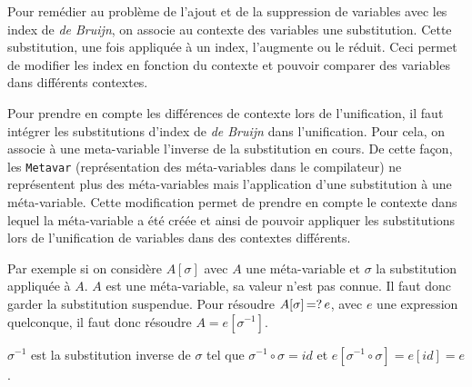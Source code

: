                 Pour remédier au problème de l'ajout et de la suppression de variables avec les index de \textit{de Bruijn}, on associe au contexte des
                variables une substitution. Cette substitution, une fois appliquée à un index, l'augmente ou le réduit.
                Ceci permet de modifier les index en fonction du contexte et pouvoir comparer des variables dans différents contextes.

                Pour prendre en compte les différences de contexte lors de l'unification, il faut intégrer
                les substitutions d'index de \textit{de Bruijn} dans l'unification.
                Pour cela, on associe à une meta-variable l'inverse de la substitution en cours. De cette
                façon, les \texttt{Metavar} (représentation des méta-variables dans le compilateur) ne représentent plus
                des méta-variables mais l'application d'une substitution à une méta-variable.
                Cette modification permet de prendre en compte le contexte dans lequel la méta-variable a été créée
                et ainsi de pouvoir appliquer les substitutions lors de l'unification de variables dans des contextes différents.

                Par exemple si on considère $A[\sigma]$ avec $A$ une méta-variable et $\sigma$ la substitution appliquée à $A$.
                $A$ est une méta-variable, sa valeur n'est pas connue. Il faut donc garder la substitution suspendue.
                Pour résoudre $A[\sigma] \operatorname{\mathbin{=?}} e$, avec $e$ une expression quelconque, il faut donc résoudre $A = e[\sigma^{-1}]$.

                $\sigma^{-1}$ est la substitution inverse de $\sigma$ tel que $\sigma^{-1} \circ \sigma = id$ et $e[\sigma^{-1} \circ \sigma] = e[id] = e$.

